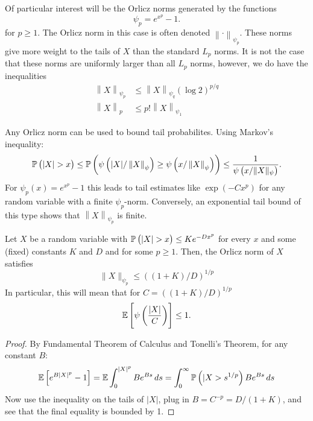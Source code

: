 \begin{remark}
    \label{rem:orlicz-p-norm}
	Of particular interest will be the Orlicz norms generated by the functions
	\[
		\psi_p = e^{x^p}-1
	.\] 
	for \(p\geq 1\). The Orlicz norm in this case is often denoted \(\left\|\cdot\right\|_{\psi_p}\).  These norms give more weight to the tails of \(X\) than the standard  \(L_p\) norms. It is not the case that these norms are uniformly larger than all \(L_p\) norms, however, we do have the inequalities
	\begin{align*}
		\left\|X\right\|_{\psi_p} &\leq \left\|X\right\|_{\psi_q}\left(\log 2\right)^{p/q}\\ 
		\left\|X\right\|_p &\leq p!\left\|X\right\|_{\psi_1}
	\end{align*}
\end{remark}

\begin{remark}
    \label{rem:orlicz}
	Any Orlicz norm can be used to bound tail probabilites. Using Markov's inequality:
	\[
		\P\left(\left|X\right|>x\right)\leq \P\left(\psi\left(|X|/\left\|X\right\|_\psi\right)\geq \psi\left(x/\left\|X\right\|_\psi\right)\right) \leq \frac{1}{\psi\left(x/\|X\|_\psi\right)} 
	.\] 
	For \(\psi_p(x) = e^{x^p}-1\) this leads to tail estimates like  \(\exp\left(-Cx^p\right)\) for any random variable with a finite \(\psi_p\)-norm. Conversely, an exponential tail bound of this type shows that  \(\left\|X\right\|_{\psi_p}\) is finite.
\end{remark}

\begin{lemma}
	\label{lemma:vdv2.2.1}
	Let \(X\) be a random variable  with  \(\P\left(|X|>x\right)\leq Ke^{-Dx^p}\) for every \(x\) and some (fixed) constants  \(K\) and  \(D\) and for some  \(p \geq 1\). Then, the Orlicz norm of \(X\) satisfies  \[\|X\|_{\psi_p}\leq \left((1+K)/D\right)^{1/p}\]
	In particular, this will mean that for \(C = \left((1+K)/D\right)^{1/p}\)
	\[
	    \mathbb{E}\left[\psi\left(\frac{|X|}{C}\right)\right]\leq 1
	.\] 
\end{lemma}
\begin{proof}
	By Fundamental Theorem of Calculus and Tonelli's Theorem, for any constant \(B\):
	\begin{align*}
		\mathbb{E}\left[e^{B|X|^p}-1\right]= \mathbb{E}\int_0^{|X|^p}Be^{Bs}\,ds = \int_0^\infty \mathbb{P}\left(|X> s^{1/p}\right)Be^{Bs}\,ds
	\end{align*}
	Now use the inequality on the tails of \(|X|\), plug in \(B = C^{-p}= D/(1+K)\), and see that the final equality is bounded by 1.
\end{proof}

